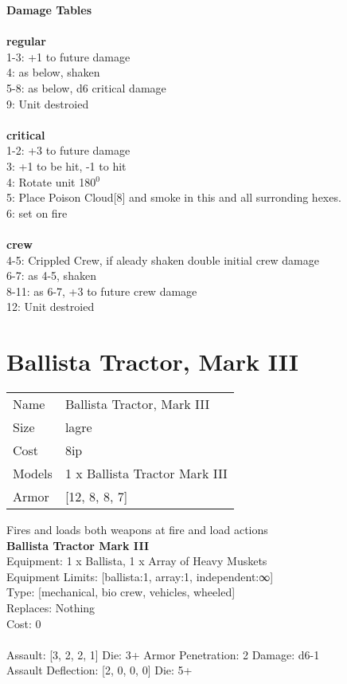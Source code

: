 {\bf Damage Tables} \\
\ \\ {\bf regular } \\
1-3: +1 to future damage \\
4: as below, shaken \\
5-8: as below, d6 critical damage \\
9: Unit destroied \\
\ \\ {\bf critical } \\
1-2: +3 to future damage \\
3: +1 to be hit, -1 to hit \\
4: Rotate unit 180$^0$ \\
5: Place Poison Cloud[8] and smoke in this and all surronding hexes. \\
6: set on fire \\
\ \\ {\bf crew } \\
4-5: Crippled Crew, if aleady shaken double initial crew damage \\
6-7: as 4-5, shaken \\
8-11: as 6-7, +3 to future crew damage \\
12: Unit destroied \\










\pagebreak\pagebreak

\section{ Ballista Tractor, Mark III }

\begin{tabular}{ll}
  Name & Ballista Tractor, Mark III \\
  Size & lagre\\
  Cost & 8ip\\
  Models & 1 x Ballista Tractor Mark III\\
  Armor & [12, 8, 8, 7]\\
\end{tabular}

\noindent Fires and loads both weapons at fire and load actions\\ 


{\bf Ballista Tractor Mark III } \\
Equipment: 1 x Ballista, 1 x Array of Heavy Muskets \\
Equipment Limits: [ballista:1, array:1, independent:∞] \\
Type: [mechanical, bio crew, vehicles, wheeled] \\
Replaces: Nothing \\
Cost: 0\\
\ \\
Assault: [3, 2, 2, 1] Die: 3+ Armor Penetration: 2 Damage: d6-1 \\
Assault Deflection: [2, 0, 0, 0] Die: 5+\\
\indent  
\ \\

